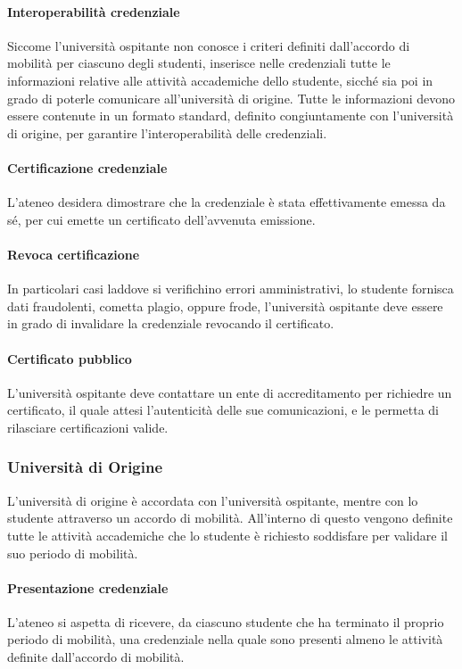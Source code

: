 \documentclass[a4paper,12pt]{article}
\begin{document}
\paragraph{Interoperabilità credenziale} Siccome l'università ospitante non conosce i criteri definiti dall'accordo di mobilità per ciascuno degli studenti, inserisce nelle credenziali tutte le informazioni relative alle attività accademiche dello studente, sicché sia poi in grado di poterle comunicare all'università di origine. Tutte le informazioni devono essere contenute in un formato standard, definito congiuntamente con l'università di origine, per garantire l'interoperabilità delle credenziali.
\paragraph{Certificazione credenziale} L'ateneo desidera dimostrare che la credenziale è stata effettivamente emessa da sé, per cui emette un certificato dell'avvenuta emissione.
\paragraph{Revoca certificazione} In particolari casi laddove si verifichino errori amministrativi, lo studente fornisca dati fraudolenti, cometta plagio, oppure frode, l'università ospitante deve essere in grado di invalidare la credenziale revocando il certificato.
\paragraph{Certificato pubblico} L'università ospitante deve contattare un ente di accreditamento per richiedre un certificato, il quale attesi l'autenticità delle sue comunicazioni, e le permetta di rilasciare certificazioni valide.

\subsubsection{Università di Origine}
L'università di origine è accordata con l'università ospitante, mentre con lo studente attraverso un accordo di mobilità. All'interno di questo vengono definite tutte le attività accademiche che lo studente è richiesto soddisfare per validare il suo periodo di mobilità.
\paragraph{Presentazione credenziale} L'ateneo si aspetta di ricevere, da ciascuno studente che ha terminato il proprio periodo di mobilità, una credenziale nella quale sono presenti almeno le attività definite dall'accordo di mobilità.
\end{document}

